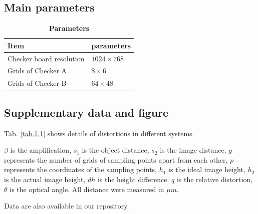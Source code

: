 \documentclass[12pt,a4paper,UTF8]{article}
\begin{document}
    \subsection{Main parameters}
    \begin{table}[htbp]
        \centering
        \caption{\textbf{Parameters}}
        \label{tab.1.0}
            \begin{tabular}{ll}
                \toprule
                Item &parameters  \\
                \midrule
                Checker board resolution & $1024 \times 768$ \\
                Grids of Checker A & $8 \times 6$  \\
                Grids of Checker B & $64 \times 48$  \\
                \bottomrule
            \end{tabular}
    \end{table}	

    \subsection{Supplementary data and figure}
    Tab. \ref{tab.1.1} shows details of distortions in different systems.
    
    $\beta$ is the amplification, $s_1$ is the object distance, $s_2$ is the image distance,
    $g$ represents the number of grids of sampling points apart from each other, $p$ represents the coordinates of the sampling points, 
    $h_1$ is the ideal image height, $h_2$ is the actual image height, $dh$ is the height difference.
    $q$ is the relative distortion, $\theta$ is the optical angle.
    All distance were measured in $\mu m$.
    
    Data are also available in our repository.
\end{document}
